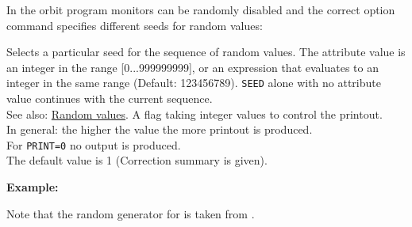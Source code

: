
In the orbit program monitors can be randomly disabled and the correct
option command specifies different seeds for random values:  

\begin{madlist}
    Selects a particular seed for the sequence of random values. 
     The attribute value is an integer in the range [0...999999999], or
     an expression that evaluates to an integer in the same range 
     (Default: 123456789). 
     \texttt{SEED} alone with no attribute value continues with the current sequence.
     \\ See also: \hyperref[subsubsec:random]{Random values}. 
    A flag taking integer values to control the printout. 
     \\ In general: the higher the value the more printout is produced.  
     \\ For \texttt{PRINT=0} no output is produced. 
     \\ The default value is 1 (Correction summary is given). 
\end{madlist}

\textbf{Example:}

Note that the random generator for \mad is taken from \cite{knuth1981}.

